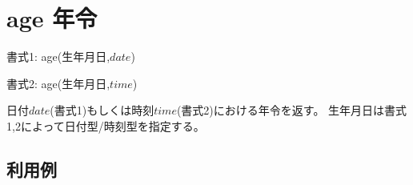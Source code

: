 
%

\section{age 年令\label{sect:age}}

書式1: age(生年月日,$date$)

書式2: age(生年月日,$time$)

日付$date$(書式1)もしくは時刻$time$(書式2)における年令を返す。
生年月日は書式1,2によって日付型/時刻型を指定する。

\subsection*{利用例}


%

